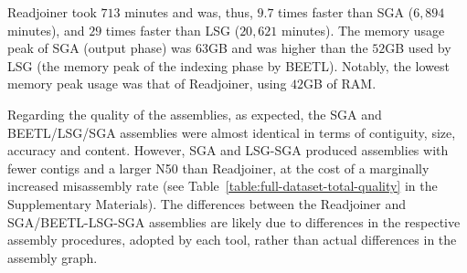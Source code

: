 \documentclass[11pt,oneside,a4paper]{article}
\begin{document}
Readjoiner took $713$ minutes and was, thus, $9.7$ times
faster than SGA ($6,894$ minutes), and $29$ times faster
than LSG ($20,621$ minutes).
%
The memory usage peak of SGA (output phase) was $63$GB and was higher than the $52$GB used by LSG (the memory peak of the indexing phase by BEETL).
%
Notably, the lowest memory peak usage was that of Readjoiner, using $42$GB
of RAM.
%

Regarding the quality of the assemblies, as expected, the SGA and
BEETL/LSG/SGA assemblies were almost identical in terms of contiguity,
size, accuracy and content.
%
However, SGA and LSG-SGA produced assemblies with fewer contigs
and a larger N50 than Readjoiner, at the cost of a marginally increased
misassembly rate (see Table~\ref{table:full-dataset-total-quality} in the
Supplementary Materials).
%
The differences between the Readjoiner and SGA/BEETL-LSG-SGA assemblies are likely
due to differences in the respective assembly procedures, adopted by each
tool, rather than actual differences in the assembly graph.


\end{document}

